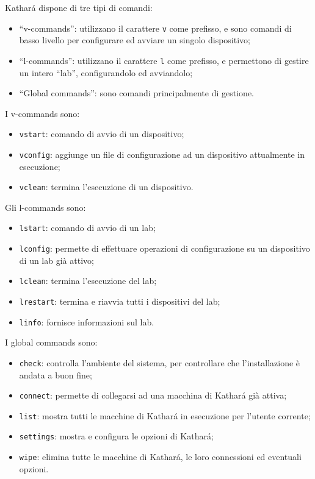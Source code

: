 \documentclass{article}
\numberwithin{equation}{subsection}
\begin{document}
Kathar\'{a} dispone di tre tipi di comandi:
\begin{itemize}
    \item ``v-commands'': utilizzano il carattere \verb|v| come prefisso, e sono comandi di basso livello per configurare ed avviare un singolo dispositivo;
    \item ``l-commands'': utilizzano il carattere \verb|l| come prefisso, e permettono di gestire un intero ``lab'', configurandolo ed avviandolo;
    \item ``Global commands'': sono comandi principalmente di gestione. 
\end{itemize}

I v-commands sono:
\begin{itemize}
    \item \verb|vstart|: comando di avvio di un dispositivo;
    \item \verb|vconfig|: aggiunge un file di configurazione ad un dispositivo attualmente in esecuzione;
    \item \verb|vclean|: termina l'esecuzione di un dispositivo. 
\end{itemize}

Gli l-commands sono:
\begin{itemize}
    \item \verb|lstart|: comando di avvio di un lab;
    \item \verb|lconfig|: permette di effettuare operazioni di configurazione su un dispositivo di un lab già attivo;
    \item \verb|lclean|: termina l'esecuzione del lab; 
    \item \verb|lrestart|: termina e riavvia tutti i dispositivi del lab;
    \item \verb|linfo|: fornisce informazioni sul lab. 
\end{itemize}

I global commands sono:
\begin{itemize}
    \item \verb|check|: controlla l'ambiente del sistema, per controllare che l'installazione è andata a buon fine;
    \item \verb|connect|: permette di collegarsi ad una macchina di Kathar\'{a} già attiva;
    \item \verb|list|: mostra tutti le macchine di Kathar\'{a} in esecuzione per l'utente corrente;
    \item \verb|settings|: mostra e configura le opzioni di Kathar\'{a};
    \item \verb|wipe|: elimina tutte le macchine di Kathar\'{a}, le loro connessioni ed eventuali opzioni. 
\end{itemize}
\end{document}
